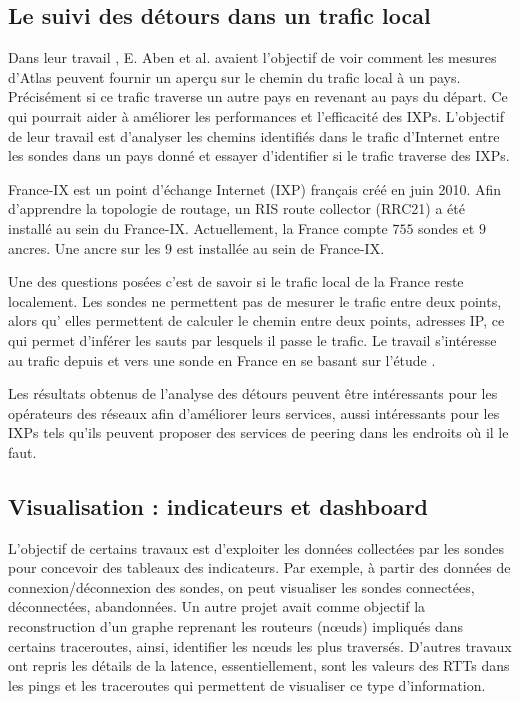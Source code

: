 \subsection{Le suivi des détours dans un trafic local}

Dans leur travail \cite{Emile-Aben-IXP-countries}, E. Aben et al. avaient l'objectif de  voir comment les mesures d'Atlas peuvent fournir un aperçu sur le chemin du trafic local à un pays. Précisément si ce trafic traverse un autre pays en revenant au pays du départ.  Ce qui pourrait  aider à améliorer les performances et l'efficacité des IXPs.  L'objectif de leur travail  est  d'analyser les chemins identifiés dans le trafic d'Internet entre les sondes dans un pays donné et essayer d'identifier si le trafic  traverse des IXPs.


France-IX est un point d'échange Internet (IXP) français créé en juin 2010. Afin d'apprendre la topologie de routage, un RIS route collector (RRC21) a été installé au sein du France-IX. Actuellement, la France compte $755$ sondes   et $9$ ancres. Une ancre sur les $9$ est installée au sein de France-IX.

Une des questions posées c'est de savoir si le trafic local de la France reste localement.  Les sondes   ne permettent pas de mesurer le trafic entre deux points, alors qu' elles permettent de calculer le chemin entre deux points, adresses IP, ce qui permet d'inférer les sauts par lesquels il passe le trafic. Le travail \cite{France-IX} s'intéresse au trafic depuis et vers une sonde en France en se basant sur l'étude \cite{Emile-Aben-IXP-countries}.


Les résultats obtenus de l'analyse des détours peuvent être intéressants pour les opérateurs des réseaux afin d'améliorer leurs services, aussi intéressants pour les IXPs tels qu'ils peuvent  proposer des services de peering dans les endroits où il le faut.


\subsection{Visualisation : indicateurs et dashboard}

L'objectif de certains travaux est  d'exploiter les données collectées par les sondes  pour concevoir des tableaux des indicateurs. Par exemple, à partir des données de connexion/déconnexion des sondes, on peut visualiser les sondes connectées, déconnectées, abandonnées. Un autre projet avait comme objectif la reconstruction d'un graphe reprenant les routeurs (n\oe{}uds) impliqués dans certains traceroutes, ainsi, identifier les n\oe{}uds les plus traversés. D'autres travaux ont repris les détails de la latence, essentiellement, sont les valeurs des RTTs dans les pings et les traceroutes qui permettent de visualiser ce type d'information. 




